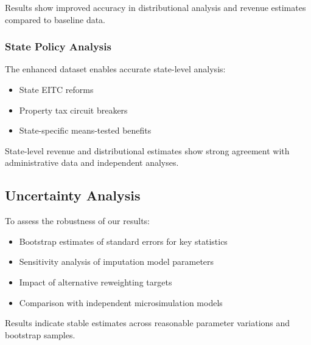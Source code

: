 Results show improved accuracy in distributional analysis and revenue estimates compared to baseline data.

\subsubsection{State Policy Analysis}

The enhanced dataset enables accurate state-level analysis:
\begin{itemize}
    \item State EITC reforms
    \item Property tax circuit breakers
    \item State-specific means-tested benefits
\end{itemize}

State-level revenue and distributional estimates show strong agreement with administrative data and independent analyses.

\subsection{Uncertainty Analysis}

To assess the robustness of our results:
\begin{itemize}
    \item Bootstrap estimates of standard errors for key statistics
    \item Sensitivity analysis of imputation model parameters
    \item Impact of alternative reweighting targets
    \item Comparison with independent microsimulation models
\end{itemize}

Results indicate stable estimates across reasonable parameter variations and bootstrap samples.